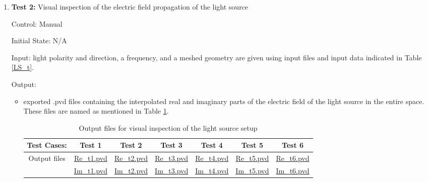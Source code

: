 \documentclass[12pt, titlepage]{article}
\begin{document}
\begin{enumerate}
	
	
	
	
		\item{\textbf{Test 2:}  Visual inspection of the electric field propagation of the light source\\}
	
	Control: Manual
	
	Initial State: N/A
	
	Input: light polarity and direction, a frequency, and a meshed geometry are given using input files and input data indicated in Table \ref{LS_t}. 

	
	Output: 
	\begin{itemize}
		\item exported .pvd files containing the interpolated real and imaginary parts of the electric field of the light source in the entire space. These files are named as mentioned in Table \ref{test_ls_out}.
			\begin{table}
			\centering
			\begin{tabular}{|c|c|c|c|c|c|c|}
				\hline
				Test Cases: & Test 1 & Test 2 & Test 3 & Test 4 & Test 5 & Test 6\\
				\hline 
				Output files & \href{https://github.com/shmouses/SPDFM/tree/master/src/Re_t1.pvd}{Re\_t1.pvd} & \href{https://github.com/shmouses/SPDFM/tree/master/src/Re_t2.pvd}{Re\_t2.pvd} & \href{https://github.com/shmouses/SPDFM/tree/master/src/Re_t3.pvd}{Re\_t3.pvd} & \href{https://github.com/shmouses/SPDFM/tree/master/src/Re_t4.pvd}{Re\_t4.pvd} & \href{https://github.com/shmouses/SPDFM/tree/master/src/Re_t5.pvd}{Re\_t5.pvd} & \href{https://github.com/shmouses/SPDFM/tree/master/src/Re_t1.pvd}{Re\_t6.pvd}\\
				
				 &
			    \href{https://github.com/shmouses/SPDFM/tree/master/src/Im_t1.pvd}{Im\_t1.pvd} & \href{https://github.com/shmouses/SPDFM/tree/master/src/Im_t2.pvd}{Im\_t2.pvd} & \href{https://github.com/shmouses/SPDFM/tree/master/src/Im_t3.pvd}{Im\_t3.pvd} & \href{https://github.com/shmouses/SPDFM/tree/master/src/Im_t4.pvd}{Im\_t4.pvd} & \href{https://github.com/shmouses/SPDFM/tree/master/src/Im_t5.pvd}{Im\_t5.pvd} & \href{https://github.com/shmouses/SPDFM/tree/master/src/Im_t1.pvd}{Im\_t6.pvd}\\
			    \hline
			\end{tabular}
			\caption{Output files for visual inspection of the light source setup}
			\label{test_ls_out}
		\end{table}
		

\end{itemize}
\end{enumerate}
\end{document}
